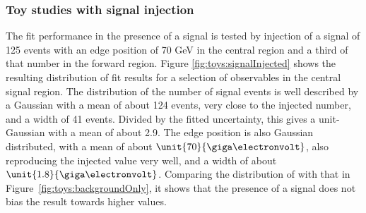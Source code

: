 \subsubsection{Toy studies with signal injection}
\label{sec:toysW}
The fit performance in the presence of a signal is tested by injection of a signal of 125 events with an edge position of 70 GeV in the central region and a third of that number in the forward region. Figure \ref{fig:toys:signalInjected} shows the resulting distribution of fit results for a selection of observables in the central signal region. The distribution of the number of signal events is well described by a Gaussian with a mean of about 124 events, very close to the injected number, and a width of 41 events. Divided by the fitted uncertainty, this gives a unit-Gaussian with a mean of about 2.9. The edge position is also Gaussian distributed, with a mean of about $\unit{70}{\giga\electronvolt}$, also reproducing the injected value very well, and a width of about $\unit{1.8}{\giga\electronvolt}$. Comparing the distribution of \Rsfof with that in Figure~\ref{fig:toys:backgroundOnly}, it shows that the presence of a signal does not bias the result towards higher values. 

